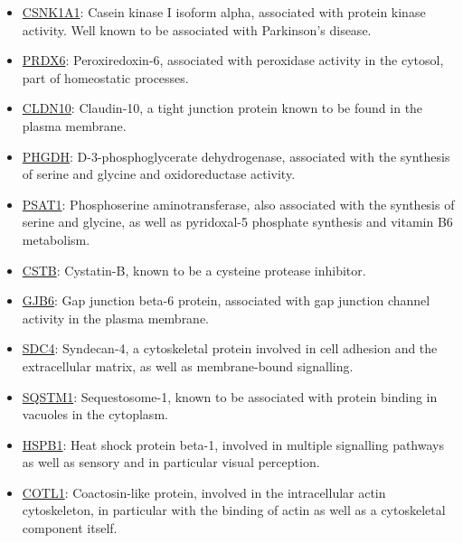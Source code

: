\begin{itemize}
\item \href{http://www.pantherdb.org/genes/gene.do?acc=HUMAN\%7CHGNC\%3D2451\%7CUniProtKB\%3DP48729}{CSNK1A1}: Casein kinase I isoform alpha, associated with protein kinase activity. Well known to be associated with Parkinson's disease.
\item \href{http://www.pantherdb.org/genes/gene.do?acc=HUMAN\%7CHGNC\%3D16753\%7CUniProtKB\%3DP30041}{PRDX6}: Peroxiredoxin-6, associated with peroxidase activity in the cytosol, part of homeostatic processes.
\item \href{http://www.pantherdb.org/genes/gene.do?acc=HUMAN\%7CHGNC\%3D2033\%7CUniProtKB\%3DP78369}{CLDN10}: Claudin-10, a tight junction protein known to be found in the plasma membrane.
\item \href{http://www.pantherdb.org/genes/gene.do?acc=HUMAN\%7CHGNC\%3D8923\%7CUniProtKB\%3DO43175}{PHGDH}: D-3-phosphoglycerate dehydrogenase, associated with the synthesis of serine and glycine and oxidoreductase activity.
\item \href{http://www.pantherdb.org/genes/gene.do?acc=HUMAN\%7CHGNC\%3D19129\%7CUniProtKB\%3DQ9Y617}{PSAT1}: Phosphoserine aminotransferase, also associated with the synthesis of serine and glycine, as well as pyridoxal-5 phosphate synthesis and vitamin B6 metabolism.
\item \href{http://www.pantherdb.org/genes/gene.do?acc=HUMAN\%7CHGNC\%3D2482\%7CUniProtKB\%3DP04080}{CSTB}: Cystatin-B, known to be a cysteine protease inhibitor.
\item \href{http://www.pantherdb.org/genes/gene.do?acc=HUMAN\%7CHGNC\%3D4288\%7CUniProtKB\%3DO95452}{GJB6}: Gap junction beta-6 protein, associated with gap junction channel activity in the plasma membrane.
\item \href{http://www.pantherdb.org/genes/gene.do?acc=HUMAN\%7CHGNC\%3D10661\%7CUniProtKB\%3DP31431}{SDC4}: Syndecan-4, a cytoskeletal protein involved in cell adhesion and the extracellular matrix, as well as membrane-bound signalling.
\item \href{http://www.pantherdb.org/genes/gene.do?acc=HUMAN\%7CHGNC\%3D11280\%7CUniProtKB\%3DQ13501}{SQSTM1}: Sequestosome-1, known to be associated with protein binding in vacuoles in the cytoplasm.
\item \href{http://www.pantherdb.org/genes/gene.do?acc=HUMAN\%7CHGNC\%3D5246\%7CUniProtKB\%3DP04792}{HSPB1}: Heat shock protein beta-1, involved in multiple signalling pathways as well as sensory and in particular visual perception.
\item \href{http://www.pantherdb.org/genes/gene.do?acc=HUMAN\%7CHGNC\%3D18304\%7CUniProtKB\%3DQ14019}{COTL1}: Coactosin-like protein, involved in the intracellular actin cytoskeleton, in particular with the binding of actin as well as a cytoskeletal component itself.

\end{itemize}

